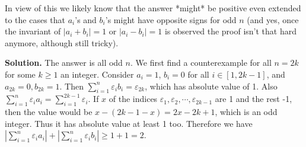 \documentclass[11pt,a4paper]{article}
\begin{document}
\begin{itemize}
In view of this we likely know that the answer *might* be positive even extended to the cases that $a_i$'s and $b_i$'s might have opposite signs for odd $n$ (and yes, once the invariant of $|a_i+b_i|=1$ or $|a_i-b_i|=1$ is observed the proof isn't that hard anymore, although still tricky). 

\textbf{Solution.} 
The answer is all odd $n$. 
We first find a counterexample for all $n=2k$ for some $k\ge 1$ an integer. 
Consider $a_i=1$, $b_i=0$ for all $i\in [1, 2k-1]$, 
and $a_{2k}=0, b_{2k}=1$. 
Then $\sum_{i=1}^n \varepsilon_i b_i=\varepsilon_{2k}$, which has absolute value of 1. 
Also $\sum_{i=1}^n \varepsilon_i a_i=\sum_{i=1}^{2k-1} \varepsilon_i$. 
If $x$ of the indices $\varepsilon_1, \varepsilon_2, \cdots , \varepsilon_{2k-1}$ are 1 and the rest -1, 
then the value would be $x-(2k-1-x)=2x-2k+1$, which is an odd integer. Thus it has absolute value at least 1 too. 
Therefore we have 
$\left| \sum_{i=1}^n \varepsilon_i a_i \right| + \left| \sum_{i=1}^n \varepsilon_i b_i \right|\ge 1+1=2$. 


\end{itemize}
\end{document}
